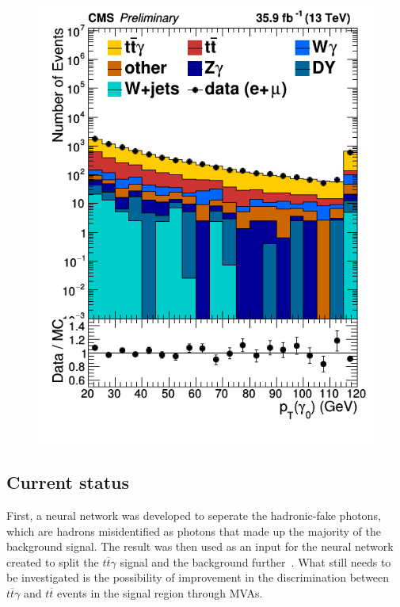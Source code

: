 \documentclass[11pt]{scrartcl}
\begin{document}
\begin{figure}[H]
\begin{minipage}{.5\textwidth}
  \includegraphics[width=1\linewidth]{figures/PhotonGood0_pt_log.png}
  \label{fig:PhotonPTlog}
\end{minipage}
\end{figure}

	\subsection{Current status}
	
	First, a neural network was developed to seperate the hadronic-fake photons, which are hadrons misidentified as photons that made up the majority of the background signal. The result was then used as an input for the neural network created to split the $t\overline{t}\gamma$ signal and the background further~\cite{ATLAS}. What still needs to be investigated is the possibility of improvement in the discrimination between $t\overline{t}\gamma$ and $t\overline{t}$ events in the signal region through MVAs.
\end{document}
